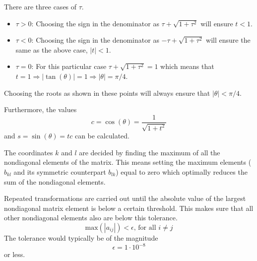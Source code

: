 There are three cases of $\tau$.
\begin{itemize}
    \item $\tau > 0$: Choosing the sign in the denominator as $\tau
        + \sqrt{1 + \tau^2}$ will ensure $t < 1$.
    \item $\tau < 0$: Choosing the sign in the denominator as
        $-\tau + \sqrt{1 + \tau^2}$ will ensure the same as the above
        case, $|t| < 1$.
    \item $\tau = 0$: For this particular case $\tau + \sqrt{1 +
        \tau^2} = 1$ which means that $t = 1 \Rightarrow
        |\tan{(\theta)}| = 1 \Rightarrow |\theta| = \pi/4$.
\end{itemize}
Choosing the roots as shown in these points will always ensure that
$|\theta| < \pi / 4$.

Furthermore, the values \[c = \cos{(\theta)} = \frac{1}{\sqrt{1 +
t^2}}\] and $s = \sin{(\theta)} = tc$ can be calculated. 

The coordinates $k$ and $l$ are decided by finding the maximum of
all the nondiagonal elements of the matrix. This means setting the
maximum elements ($b_{kl}$ and its symmetric counterpart $b_{lk}$)
equal to zero which optimally reduces the sum of the nondiagonal
elements.

Repeated transformations are carried out until the absolute value
of the largest nondiagonal matrix element is below a certain
threshold. This makes sure that all other nondiagonal elements also
are below this tolerance. \[\text{max}(|a_{ij}|) < \epsilon \text{,
for all } i \neq j\] The tolerance would typically be of the
magnitude \[\epsilon = 1 \cdot 10^{-8}\] or less.
